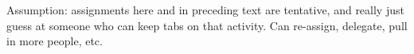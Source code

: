 \documentclass[conference,10pt,compsocconf]{IEEEtran}
\newcommand{\assign}[1]{\textcolor{red}{(#1)}}
\begin{document}
Assumption: assignments here and in preceding text are tentative, and really
just guess at someone who can keep tabs on that activity.  Can re-assign,
delegate, pull in more people, etc.

%
%
%
%
%
%
\end{document}
